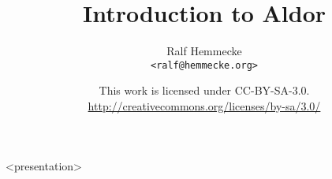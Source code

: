 



{
}
{
  \usepackage{hyperref}
  \usepackage{fullpage}
  \parindent0pt
}

\usepackage[english]{babel}
\usepackage[latin1]{inputenc}
\usepackage{times}
\usepackage[T1]{fontenc}

\title{Introduction to Aldor}

\author[Ralf Hemmecke]%
       {Ralf Hemmecke \\\footnotesize{\texttt{<ralf@hemmecke.org>}}}
\date{%
  \footnotesize{This work is licensed under CC-BY-SA-3.0.\\
    \url{http://creativecommons.org/licenses/by-sa/3.0/}}%
}

\subject{Introduction to Aldor}

\usepackage{listings}
%
  {\footnotesize\ttfamily}%
  {}
%
  {\footnotesize\ttfamily}%
  {}
\usepackage{verbatim}
\newenvironment{smallverbatim}%
   {\footnotesize\verbatim}%
   {\endverbatim}



\maketitle
\begin{frame}<presentation>
  \titlepage
\end{frame}

